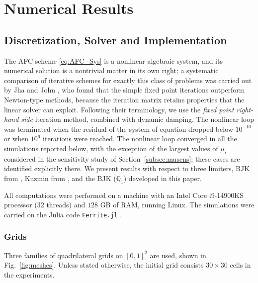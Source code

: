 \documentclass[a4paper]{article}
\theoremstyle{plain}
\theoremstyle{definition}
\theoremstyle{remark}
\begin{document}
\section{Numerical Results}
\label{sec:numerics}

\subsection{Discretization, Solver and Implementation}
\label{subsec:setup}

The AFC scheme \eqref{eq:AFC_Sys} is a nonlinear algebraic system, and its numerical
solution is a nontrivial matter in its own right; a systematic comparison of iterative
schemes for exactly this class of problems was carried out by Jha and John
\cite{JJ19}, who found that the simple fixed point iterations outperform Newton-type
methods, because the iteration matrix retains properties that the linear solver can
exploit. Following their terminology, we use the \emph{fixed point right-hand side}
iteration method, combined with dynamic damping. The nonlinear loop was terminated when the residual of the system of equation dropped below $10^{-10}$ or when $10^6$ iterations were reached. The nonlinear loop converged in all the simulations reported below, with the exception of the largest values of $\mu_i$ considered in the sensitivity study of Section~\ref{subsec:musens}; these cases are identified explicitly there. We present results with respect to three limiters, BJK from \cite{BJK17}, Kuzmin from \cite{BJK16}, and the BJK ($\mathbb{Q}_1$) developed in this paper.

All computations were performed on a machine with an Intel Core i9-14900KS processor
(32 threads) and $128$ GB of RAM, running Linux.  The simulations were carried on the Julia code \texttt{Ferrite.jl} \cite{Ferrite_jl}.

\subsubsection{Grids}
\label{subsec:grids}

Three families of quadrilateral grids on $[0,1]^2$ are used, shown in
Fig.~\ref{fig:meshes}. Unless stated otherwise, the initial grid consists $30 \times 30$ cells in the
experiments.
\end{document}
